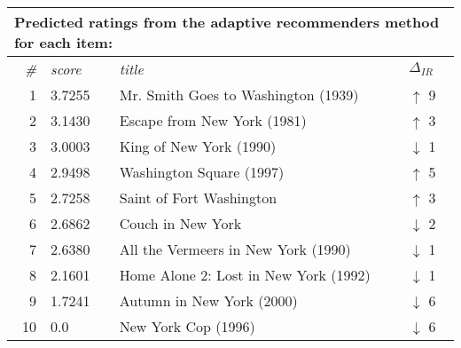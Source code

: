 \begin{table}[h]
  \begin{tabular*}{0.9\textwidth}{ r l p{8.5cm} l }
    \multicolumn{4}{l}{Predicted ratings from the adaptive recommenders method for each item:}\\
    \toprule
    \emph{\#} & \emph{score} & \emph{title} & $\Delta_{IR}$\\
    \midrule
    1 & 3.7255  &  Mr. Smith Goes to Washington (1939)    & \color{green} $\uparrow$ 9 \\
    2 & 3.1430  &  Escape from New York (1981)            & \color{green} $\uparrow$ 3 \\
    3 & 3.0003  &  King of New York (1990)                & \color{red} $\downarrow$ 1 \\
    4 & 2.9498  &  Washington Square (1997)               & \color{green} $\uparrow$ 5 \\
    5 & 2.7258  &  Saint of Fort Washington               & \color{green} $\uparrow$ 3 \\
    6 & 2.6862  &  Couch in New York                      & \color{red} $\downarrow$ 2 \\
    7 & 2.6380  &  All the Vermeers in New York (1990)    & \color{red} $\downarrow$ 1 \\
    8 & 2.1601  &  Home Alone 2: Lost in New York (1992)  & \color{red} $\downarrow$ 1 \\
    9 & 1.7241  &  Autumn in New York (2000)              & \color{red} $\downarrow$ 6 \\
    10& 0.0     &  New York Cop (1996)                    & \color{red} $\downarrow$ 6 \\
    \bottomrule
  \end{tabular*}

  \vspace{1em} 


\end{table}
